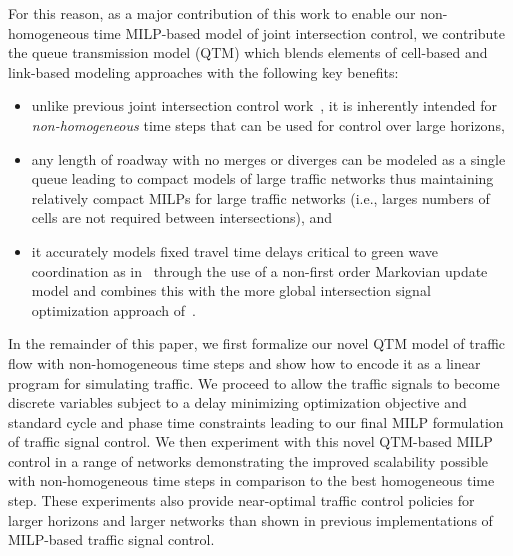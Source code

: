 For this reason, as a major contribution of this work to enable our
non-homogeneous time MILP-based model of joint intersection control, we
contribute the queue transmission model (QTM) which blends elements of
cell-based and link-based modeling approaches with the following key
benefits:
\begin{itemize}
%
\item  unlike previous joint intersection control
  work~, it is
  inherently intended for \emph{non-homogeneous} time steps that can
  be used for control over large horizons,
%
\item any length of roadway with no merges or diverges can be modeled
  as a single queue leading to compact models of large traffic
  networks thus maintaining relatively compact MILPs for large traffic
  networks (i.e., larges numbers of cells are not required between
  intersections), and
%
\item it accurately models fixed travel time delays critical to green wave
  coordination as
  in~
  through the use of a non-first order Markovian update model and combines this
  with the more global intersection signal optimization approach
  of~.
\end{itemize}


In the remainder of this paper, we first formalize our
novel QTM model of traffic flow with non-homogeneous time steps and
show how to encode it as a linear program for simulating traffic.
%
We proceed to allow the traffic signals to
become discrete variables subject to a delay minimizing optimization
objective and standard cycle and phase time constraints leading to our
final MILP formulation of traffic signal control.
%
We then experiment with this novel QTM-based MILP control in
a range of networks demonstrating the improved scalability possible
with non-homogeneous time steps in comparison to the best homogeneous
time step.
%
These experiments also provide near-optimal traffic control policies
for larger horizons and larger networks than shown in previous
implementations of MILP-based traffic signal control.

